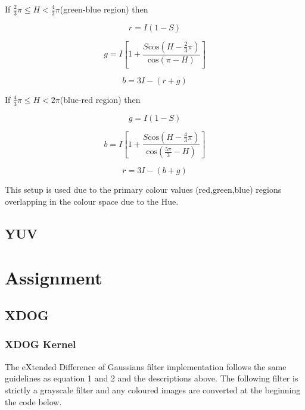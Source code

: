 \documentclass{article}
\begin{document}
	If $\frac{2}{3}\pi \leq H < \frac{4}{3}\pi$(green-blue region) then
	
	\begin{equation}
	r = I(1 - S)
	\end{equation}
	
	\begin{equation}
	g = I\left[1 + \frac{S\textrm{cos}(H - \frac{2}{3}\pi)}{\textrm{cos}(\pi - H)}\right]
	\end{equation}
	
	\begin{equation}
	b = 3I - (r + g)
	\end{equation}
	
	If $\frac{4}{3}\pi \leq H < 2\pi$(blue-red region) then
	
	\begin{equation}
	g = I(1 - S)
	\end{equation}
	
	\begin{equation}
	b = I\left[1 + \frac{S\textrm{cos}(H - \frac{4}{3}\pi)}{\textrm{cos}(\frac{5\pi}{3} - H)}\right]
	\end{equation}
	
	\begin{equation}
	r = 3I - (b + g)
	\end{equation}
	
	This setup is used due to the primary colour values (red,green,blue) regions overlapping in the colour space due to the Hue.
	
	\subsection{YUV}
	
	
	
	\section{Assignment}
	
	\subsection{XDOG}
	
	\subsubsection{XDOG Kernel}
	
	The eXtended Difference of Gaussians filter implementation follows the same guidelines as equation 1 and 2 and the descriptions above. The following filter is strictly a grayscale filter and any coloured images are converted at the beginning the code below.\\
		
\end{document}
